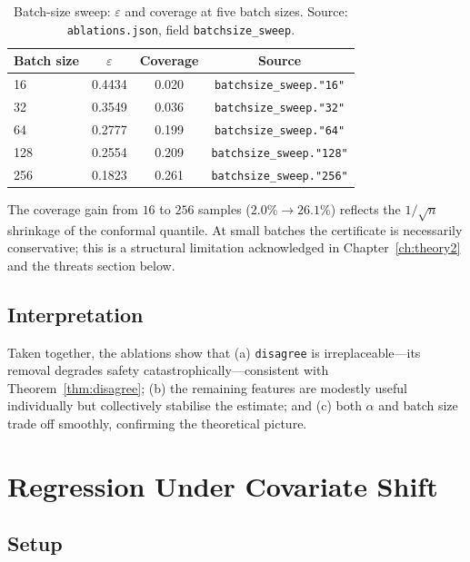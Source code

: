 \begin{table}[ht]
\centering
\caption{Batch-size sweep: $\varepsilon$ and coverage at five batch sizes.
  Source: \texttt{ablations.json}, field \texttt{batchsize\_sweep}.}
\label{tab:exp1-batch}
\begin{tabular}{lccc}
\toprule
Batch size & $\varepsilon$ & Coverage & Source \\
\midrule
16  & 0.4434 & 0.020 & \texttt{batchsize\_sweep."16"} \\
32  & 0.3549 & 0.036 & \texttt{batchsize\_sweep."32"} \\
64  & 0.2777 & 0.199 & \texttt{batchsize\_sweep."64"} \\
128 & 0.2554 & 0.209 & \texttt{batchsize\_sweep."128"} \\
256 & 0.1823 & 0.261 & \texttt{batchsize\_sweep."256"} \\
\bottomrule
\end{tabular}
\end{table}

The coverage gain from $16$ to $256$ samples ($2.0\% \to 26.1\%$) reflects the
$1/\sqrt{n}$ shrinkage of the conformal quantile.  At small batches the certificate is
necessarily conservative; this is a structural limitation acknowledged in
Chapter~\ref{ch:theory2} and the threats section below.

\subsection{Interpretation}

Taken together, the ablations show that (a) \texttt{disagree} is irreplaceable---its
removal degrades safety catastrophically---consistent with Theorem~\ref{thm:disagree};
(b) the remaining features are modestly useful individually but collectively stabilise the
estimate; and (c) both $\alpha$ and batch size trade off smoothly, confirming the
theoretical picture.

\section{Regression Under Covariate Shift}
\label{sec:exp1-regression}

\subsection{Setup}

